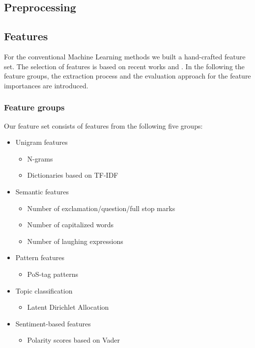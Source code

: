 \subsection{Preprocessing}
\label{ch:approachB}



\subsection{Features}
\label{ch:approachC}

For the conventional Machine Learning methods we built a hand-crafted feature set. The selection of features is based on recent works \cite{Watanabe2018} and \cite{Fortuna2018}. In the following the feature groups, the extraction process and the evaluation approach for the feature importances are introduced.

\subsubsection*{Feature groups}

Our feature set consists of features from the following five groups:
\begin{itemize}
	\item Unigram features \cite{ThomasDavidson2020, Fortuna2018, Gaydhani2018, Malmasi2017, Oriola2020}
	\begin{itemize}
		\item N-grams
		\item Dictionaries based on TF-IDF
	\end{itemize}
	\item Semantic features \cite{ThomasDavidson2020, Watanabe2018}
	\begin{itemize}
		\item Number of exclamation/question/full stop marks
		\item Number of capitalized words
		\item Number of laughing expressions
	\end{itemize}
	\item Pattern features \cite{Fortuna2018, Oriola2020}
	\begin{itemize}
		\item PoS-tag patterns
	\end{itemize}
	\item Topic classification \cite{Fortuna2018}
	\begin{itemize}
		\item Latent Dirichlet Allocation
	\end{itemize}
	\item Sentiment-based features \cite{Fortuna2018, Oriola2020}
	\begin{itemize}
		\item Polarity scores based on Vader
	\end{itemize}
\end{itemize}

